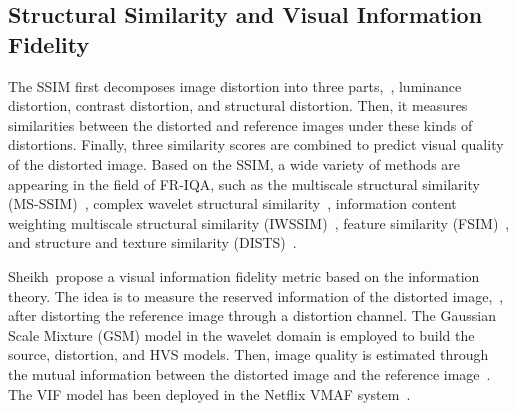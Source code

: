 \subsection{Structural Similarity and Visual Information Fidelity}
The SSIM first decomposes image distortion into three parts,~\ie, luminance distortion, contrast distortion, and structural distortion. Then, it measures similarities between the distorted and reference images under these kinds of distortions. Finally, three similarity scores are combined to predict visual quality of the distorted image. Based on the SSIM, a wide variety of methods are appearing in the field of FR-IQA, such as the multiscale structural similarity (MS-SSIM)~\citep{wang2003multiscale}, complex wavelet structural similarity~\citep{sampat2009complex}, information content weighting multiscale structural similarity (IWSSIM)~\citep{wang2010information}, feature similarity (FSIM)~\citep{zhang2011fsim}, and structure and texture similarity (DISTS)~\citep{dingIQA}.

Sheikh~\etal propose a visual information fidelity metric based on the information theory. The idea is to measure the reserved information of the distorted image,~\ie, after distorting the reference image through a distortion channel. The Gaussian Scale Mixture (GSM) model in the wavelet domain is employed to build the source, distortion, and HVS models. Then, image quality is estimated through the mutual information between the distorted image and the reference image~\citep{sheikh2006image, sheikh2005information}. The VIF model has been deployed in the Netflix VMAF system~\citep{li2016toward}.

